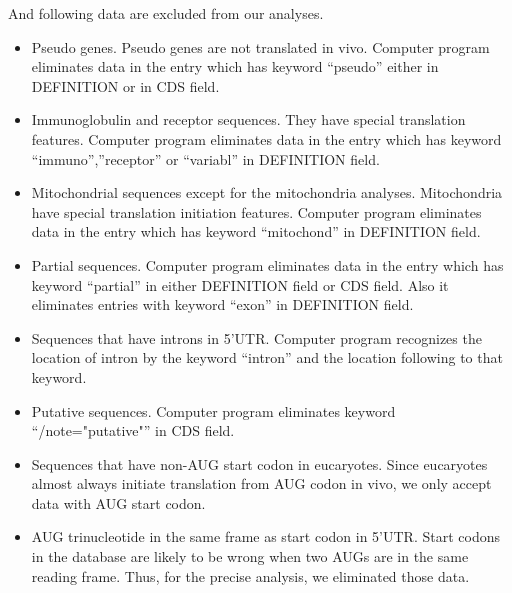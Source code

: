 And following data are excluded from our analyses.
\begin{itemize}
\item Pseudo genes. Pseudo genes are not translated in vivo. Computer
program eliminates data in the entry which  has keyword
``pseudo'' either in DEFINITION or in CDS field.
\item Immunoglobulin and receptor sequences. They have special translation
features. Computer program eliminates data in the entry which has keyword
``immuno'',''receptor'' or ``variabl'' in DEFINITION field. 
\item Mitochondrial sequences except for the mitochondria analyses.
Mitochondria have special translation initiation features. Computer
program eliminates data in the entry which has keyword ``mitochond''
in DEFINITION field. 
\item Partial sequences. Computer program eliminates data in the entry 
which has keyword ``partial'' in either DEFINITION field or CDS field.
Also it eliminates entries with keyword ``exon'' in DEFINITION field. 
\item Sequences that have introns in 5'UTR. Computer program
recognizes the location of intron by the keyword ``intron'' and the
location following to that keyword.
\item Putative sequences. Computer program eliminates keyword
``/note="putative"'' in CDS field.
\item Sequences that have non-AUG start codon in eucaryotes. Since
eucaryotes almost always initiate translation from AUG codon in vivo, we
only accept data with AUG start codon. 
\item AUG trinucleotide in the same frame as start codon in 5'UTR.
Start codons in the database are likely to be wrong when two AUGs are
in the same reading frame. Thus, for the precise analysis, we
eliminated those data.


\end{itemize}




